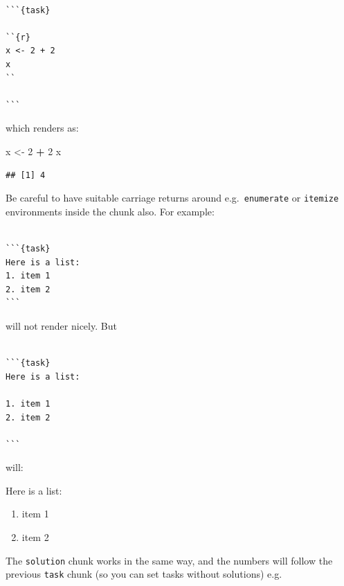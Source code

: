 \documentclass[]{book}
\newenvironment{Shaded}{\begin{snugshade}}{\end{snugshade}}
\newcommand{\DecValTok}[1]{\textcolor[rgb]{0.00,0.00,0.81}{#1}}
\newcommand{\NormalTok}[1]{#1}
\newcommand{\OperatorTok}[1]{\textcolor[rgb]{0.81,0.36,0.00}{\textbf{#1}}}
\newcommand{\StringTok}[1]{\textcolor[rgb]{0.31,0.60,0.02}{#1}}
\providecommand{\tightlist}{%
  \setlength{\itemsep}{0pt}\setlength{\parskip}{0pt}}
\newcommand{\bblockT}[2][Task]{\begin{tcolorbox}[title = #1 #2, parbox = false]}
\newcommand{\eblockT}{\end{tcolorbox}}
\begin{document}
\begin{verbatim}

```{task}

``{r}
x <- 2 + 2
x
``

```
\end{verbatim}

which renders as:

\hypertarget{tsk2}{}\bblockT[Task]{\phantomsection\label{sol2}2}

\begin{Shaded}
\begin{Highlighting}[]
\NormalTok{x <-}\StringTok{ }\DecValTok{2} \OperatorTok{+}\StringTok{ }\DecValTok{2}
\NormalTok{x}
\end{Highlighting}
\end{Shaded}

\begin{verbatim}
## [1] 4
\end{verbatim}

\eblockT

Be careful to have suitable carriage returns around e.g.~\texttt{enumerate} or \texttt{itemize} environments inside the chunk also. For example:

\begin{verbatim}

```{task}
Here is a list:
1. item 1
2. item 2
```
\end{verbatim}

will not render nicely. But

\begin{verbatim}

```{task}
Here is a list:

1. item 1
2. item 2

```
\end{verbatim}

will:

\hypertarget{tsk3}{}\bblockT[Task]{\phantomsection\label{sol3}3}

Here is a list:

\begin{enumerate}
\def\labelenumi{\arabic{enumi}.}
\tightlist
\item
  item 1
\item
  item 2
\end{enumerate}

\eblockT

The \texttt{solution} chunk works in the same way, and the numbers will follow the previous \texttt{task} chunk (so you can set tasks without solutions) e.g.
\end{document}
